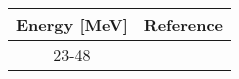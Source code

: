 \begin{tabular}{|c||c|} 
    \hline 
    \bf{Energy [MeV]} & \bf{Reference} \\
    \hline
    \hline 
    23-48 & \cite{Carlson94}\\
    \hline
\end{tabular}
